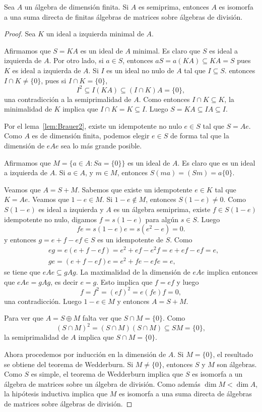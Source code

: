 \begin{theorem}
	Sea $A$ un álgebra de dimensión finita. Si $A$ es semiprima, entonces
	$A$ es isomorfa a una 
	suma directa de finitas álgebras de matrices sobre álgebras de división.
\end{theorem}

\begin{proof}
	Sea $K$ un ideal a izquierda minimal de $A$. 
	
	Afirmamos que $S=KA$ es un ideal de $A$ minimal. Es claro que $S$ es ideal a izquierda de $A$. Por otro lado, 
	si $a\in S$, entonces $aS=a(KA)\subseteq KA=S$ pues $K$ es ideal a izquierda de $A$.  
	Si $I$ es un ideal no nulo de $A$ tal que 
	$I\subseteq S$. entonces $I\cap K\ne\{0\}$, pues si $I\cap K=\{0\}$,  
	\[
	I^2\subseteq I(KA)\subseteq (I\cap K)A=\{0\},
	\]
	una contradicción a la semiprimalidad de $A$. Como entonces $I\cap K\subseteq K$, la minimalidad de $K$ implica que
	$I\cap K=K\subseteq I$. Luego
	$S=KA\subseteq IA\subseteq I$.     	
	
	Por el lema~\ref{lem:Brauer2}, existe un idempotente no nulo $e\in S$ tal que $S=Ae$. 
	Como $A$ es de dimensión finita, podemos elegir 
	$e\in S$ de forma tal que la dimensión de $eAe$ sea lo más grande posible. 

	Afirmamos que $M=\{a\in A:Sa=\{0\}\}$ es un ideal de $A$. Es claro que es un ideal a izquierda de $A$. Si $a\in A$, 
	y $m\in M$, entonces $S(ma)=(Sm)=a\{0\}$. 
	
	Veamos que $A=S+M$. Sabemos que existe un idempotente $e\in K$ tal que $K=Ae$. Veamos que $1-e\in M$. Si $1-e\not\in M$, entonces
	$S(1-e)\ne 0$. Como $S(1-e)$ es ideal a izquierda y $A$ es un álgebra semiprima, 
	existe $f\in S(1-e)$ idempotente no nulo, digamos $f=s(1-e)$ para algún $s\in S$. Luego 
	\[
	fe=s(1-e)e=s(e^2-e)=0.
	\]
	y entonces $g=e+f-ef\in S$ es un idempotente de $S$. Como
	\begin{align*}
	&eg=e(e+f-ef)=e^2+ef-e^2f=e+ef-ef=e,\\
	&ge=(e+f-ef)e=e^2+fe-efe=e,
	\end{align*}
	se tiene que $eAe\subseteq gAg$. La maximalidad de la dimensión de $eAe$ implica entonces
	que $eAe=gAg$, es decir $e=g$. Esto implica que $f=ef$ y luego  
	\[
	f=f^2=(ef)^2=e(fe)f=0,
	\]
	una contradicción. 
	Luego $1-e\in M$ y entonces $A=S+M$. 
	
	Para ver que $A=S\oplus M$ falta ver que $S\cap M=\{0\}$. Como 
	\[
	(S\cap M)^2=(S\cap M)(S\cap M)\subseteq SM=\{0\},
	\]
	la semiprimalidad
	de $A$ implica que $S\cap M=\{0\}$.
	
	Ahora procedemos por inducción en la dimensión de $A$. 
	Si $M=\{0\}$, el resultado se obtiene del teorema de Wedderburn. Si $M\ne\{0\}$, entonces
	$S$ y $M$ son álgebras. Como $S$ es simple, el teorema de Wedderburn implica que $S$ es isomorfa a un álgebra
	de matrices sobre un álgebra de división. Como además $\dim M<\dim A$, la hipótesis inductiva
	implica que $M$ es isomorfa a una suma directa de álgebras de matrices sobre álgebras de división.  
\end{proof}

